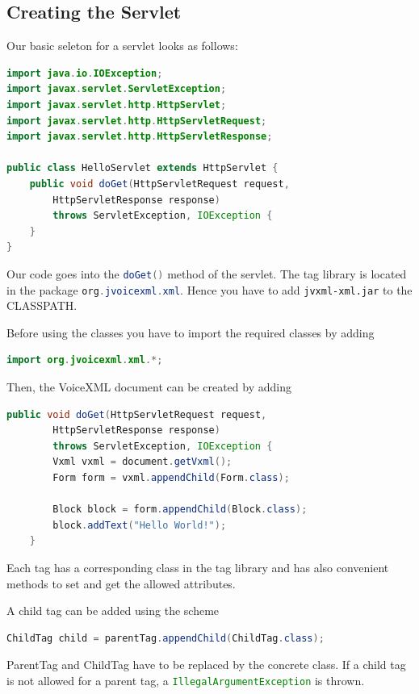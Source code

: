 \documentclass[11pt,a4paper]{article}
\begin{document}
\subsection{Creating the Servlet}

Our basic seleton for a servlet looks as follows:

\begin{lstlisting}[language=Java]
import java.io.IOException;
import javax.servlet.ServletException;
import javax.servlet.http.HttpServlet;
import javax.servlet.http.HttpServletRequest;
import javax.servlet.http.HttpServletResponse;

public class HelloServlet extends HttpServlet {
    public void doGet(HttpServletRequest request,
        HttpServletResponse response)
        throws ServletException, IOException {
    }
}
\end{lstlisting}

Our code goes into the \lstinline[language=Java]{doGet()} method of the servlet. The tag library
is located in the package \lstinline[language=Java]{org.jvoicexml.xml}. Hence you have to add
\texttt{jvxml-xml.jar} to the CLASSPATH.

Before using the classes you have to import the required classes by adding
\begin{lstlisting}[language=Java]
import org.jvoicexml.xml.*;
\end{lstlisting}

Then, the VoiceXML document can be created by adding
\begin{lstlisting}[language=Java]
    public void doGet(HttpServletRequest request,
        HttpServletResponse response)
        throws ServletException, IOException {
        Vxml vxml = document.getVxml();
        Form form = vxml.appendChild(Form.class);

        Block block = form.appendChild(Block.class);
        block.addText("Hello World!");
    }
\end{lstlisting}

Each tag has a corresponding class in the tag library and has also convenient
methods to set and get the allowed attributes.

A child tag can be added using the scheme
\begin{lstlisting}[language=Java]
ChildTag child = parentTag.appendChild(ChildTag.class);
\end{lstlisting}

ParentTag and ChildTag have to be replaced by the concrete class. If a child
tag is not allowed for a parent tag, a \lstinline[language=Java]{IllegalArgumentException} is
thrown.
\end{document}
